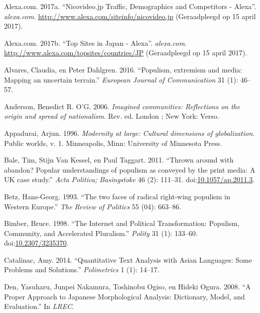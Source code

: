 \documentclass[10.5pt,dutch,]{article}
\begin{document}
\hypertarget{ref-alexa.comux5fnicovideo.jpux5f2017}{}
Alexa.com. 2017a. “Nicovideo.jp Traffic, Demographics and Competitors - Alexa”. \emph{alexa.com}. \url{http://www.alexa.com/siteinfo/nicovideo.jp} (Geraadpleegd op 15 april 2017).

\hypertarget{ref-alexa.comux5ftopux5f2017}{}
Alexa.com. 2017b. “Top Sites in Japan - Alexa”.  \emph{alexa.com}. \url{http://www.alexa.com/topsites/countries/JP} (Geraadpleegd op 15 april 2017).

\hypertarget{ref-alvaresux5fpopulismux5f2016}{}
Alvares, Claudia, en Peter Dahlgren. 2016. “Populism, extremism and
media: Mapping an uncertain terrain.”  \emph{European Journal of
Communication} 31 (1): 46--57.

\hypertarget{ref-andersonux5fimaginedux5f2006}{}
Anderson, Benedict R. O'G. 2006. \emph{Imagined communities: Reflections
on the origin and spread of nationalism}. Rev. ed. London ; New York:
Verso.

\hypertarget{ref-appaduraiux5fmodernityux5f1996}{}
Appadurai, Arjun. 1996. \emph{Modernity at large: Cultural dimensions of
globalization}. Public worlds, v. 1. Minneapolis, Minn: University of
Minnesota Press.

\hypertarget{ref-baleux5fthrownux5f2011}{}
Bale, Tim, Stijn Van Kessel, en Paul Taggart. 2011. “Thrown around with
abandon? Popular understandings of populism as conveyed by the print
media: A UK case study.”  \emph{Acta Politica; Basingstoke} 46 (2):
111--31.
doi:\href{https://doi.org/10.1057/ap.2011.3}{10.1057/ap.2011.3}.

\hypertarget{ref-betzux5ftwoux5f1993}{}
Betz, Hans-Georg. 1993. “The two faces of radical right-wing populism in
Western Europe.”  \emph{The Review of Politics} 55 (04): 663--86.

\hypertarget{ref-bimberux5finternetux5f1998}{}
Bimber, Bruce. 1998. “The Internet and Political Transformation:
Populism, Community, and Accelerated Pluralism.” \emph{Polity} 31 (1):
133--60. doi:\href{https://doi.org/10.2307/3235370}{10.2307/3235370}.

\hypertarget{ref-catalinacux5fquantitativeux5f2014}{}
Catalinac, Amy. 2014. “Quantitative Text Analysis with Asian Languages:
Some Problems and Solutions.”  \emph{Polimetrics} 1 (1): 14--17.

\hypertarget{ref-denux5fproperux5f2008}{}
Den, Yasuharu, Junpei Nakamura, Toshinobu Ogiso, en Hideki Ogura. 2008.
“A Proper Approach to Japanese Morphological Analysis: Dictionary, Model,
and Evaluation.”  In \emph{LREC}.
\end{document}
